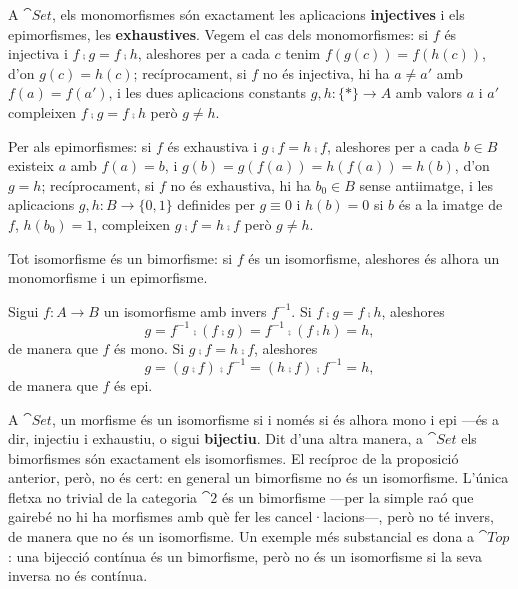 \begin{exemple}
A $\cat{Set}$, els monomorfismes són exactament les aplicacions \textbf{injectives} i els epimorfismes, les \textbf{exhaustives}. Vegem el cas dels monomorfismes: si $f$ és injectiva i $f\comp g=f\comp h$, aleshores per a cada $c$ tenim $f(g(c))=f(h(c))$, d'on $g(c)=h(c)$; recíprocament, si $f$ no és injectiva, hi ha $a\neq a'$ amb $f(a)=f(a')$, i les dues aplicacions constants $g,h\colon\{\ast\}\to A$ amb valors $a$ i $a'$ compleixen $f\comp g=f\comp h$ però $g\neq h$.

Per als epimorfismes: si $f$ és exhaustiva i $g\comp f=h\comp f$, aleshores per a cada $b\in B$ existeix $a$ amb $f(a)=b$, i $g(b)=g(f(a))=h(f(a))=h(b)$, d'on $g=h$; recíprocament, si $f$ no és exhaustiva, hi ha $b_0\in B$ sense antiimatge, i les aplicacions $g,h\colon B\to\{0,1\}$ definides per $g\equiv 0$ i $h(b)=0$ si $b$ és a la imatge de $f$, $h(b_0)=1$, compleixen $g\comp f=h\comp f$ però $g\neq h$.
\end{exemple}

\begin{proposicio}
Tot isomorfisme és un bimorfisme: si $f$ és un isomorfisme, aleshores és alhora un monomorfisme i un epimorfisme.
\end{proposicio}

\begin{prova}
Sigui $f\colon A\to B$ un isomorfisme amb invers $f^{-1}$. Si $f\comp g=f\comp h$, aleshores
\[
g=f^{-1}\comp(f\comp g)=f^{-1}\comp(f\comp h)=h,
\]
de manera que $f$ és mono. Si $g\comp f=h\comp f$, aleshores
\[
g=(g\comp f)\comp f^{-1}=(h\comp f)\comp f^{-1}=h,
\]
de manera que $f$ és epi.
\end{prova}

\begin{observacio}
A $\cat{Set}$, un morfisme és un isomorfisme si i només si és alhora mono i epi ---és a dir, injectiu i exhaustiu, o sigui \textbf{bijectiu}. Dit d'una altra manera, a $\cat{Set}$ els bimorfismes són exactament els isomorfismes. El recíproc de la proposició anterior, però, no és cert: en general un bimorfisme no és un isomorfisme. L'única fletxa no trivial de la categoria $\cat{2}$ és un bimorfisme ---per la simple raó que gairebé no hi ha morfismes amb què fer les cancel·lacions---, però no té invers, de manera que no és un isomorfisme. Un exemple més substancial es dona a $\cat{Top}$: una bijecció contínua és un bimorfisme, però no és un isomorfisme si la seva inversa no és contínua.
\end{observacio}

